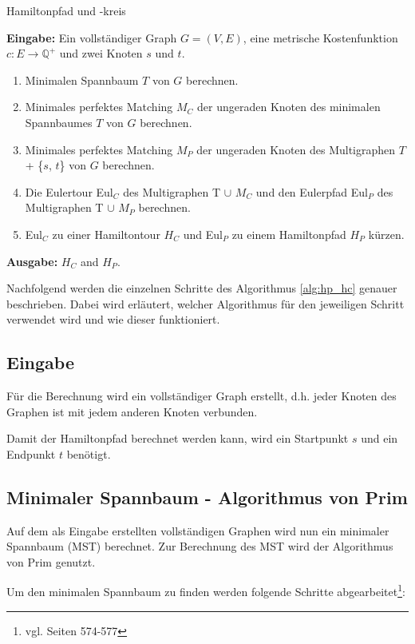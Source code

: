 \documentclass[11pt,a4paper]{article}
\begin{document}
\begin{algorithm}
    \caption{Hamiltonpfad und -kreis \cite{moemke11}}
    \label{alg:hp_hc}
\textbf{Eingabe:} Ein vollständiger Graph $G = (V,E)$, eine metrische Kostenfunktion $c: E \rightarrow \mathbb{Q}^+$ und zwei Knoten $s$ und $t$.
    \begin{enumerate} \item Minimalen Spannbaum $T$ von $G$ berechnen.
        \item Minimales perfektes Matching $M_C$ der ungeraden Knoten des minimalen Spannbaumes $T$ von $G$ berechnen.
        \item Minimales perfektes Matching $M_P$ der ungeraden Knoten des Multigraphen $T$ + \{$s$, $t$\} von $G$ berechnen.
        \item Die Eulertour Eul$_C$ des Multigraphen T $\cup$ $M_C$ und den Eulerpfad Eul$_P$ des Multigraphen T $\cup$ $M_P$ berechnen.
        \item Eul$_C$ zu einer Hamiltontour $H_C$ und Eul$_P$ zu einem Hamiltonpfad $H_P$ kürzen.
    \end{enumerate}
\textbf{Ausgabe:} $H_C$ and $H_P$.

\end{algorithm}

Nachfolgend werden die einzelnen Schritte des Algorithmus \ref{alg:hp_hc} genauer beschrieben. Dabei wird erläutert, welcher Algorithmus für den jeweiligen Schritt verwendet wird und wie dieser funktioniert.

\subsection{Eingabe}
Für die Berechnung wird ein vollständiger Graph erstellt, d.h. jeder Knoten des Graphen ist mit jedem anderen Knoten verbunden.

Damit der Hamiltonpfad berechnet werden kann, wird ein Startpunkt $s$ und ein Endpunkt $t$ benötigt.


\newpage

\subsection{Minimaler Spannbaum - Algorithmus von Prim}
Auf dem als Eingabe erstellten vollständigen Graphen wird nun ein minimaler Spannbaum (MST) berechnet. Zur Berechnung des MST wird der Algorithmus von Prim genutzt.

Um den minimalen Spannbaum zu finden werden folgende Schritte abgearbeitet\footnote{vgl. \cite{cormen07} Seiten 574-577}:
\end{document}
